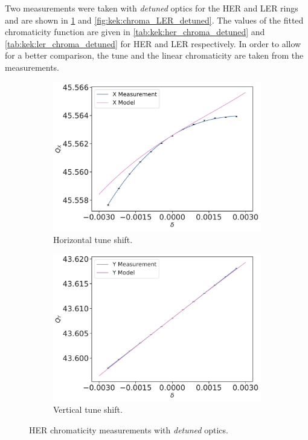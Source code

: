 Two measurements were taken with \textit{detuned} optics for the HER and LER rings and are shown in
\cref{fig:kek:chroma_HER_detuned} and \cref{fig:kek:chroma_LER_detuned}. The values of the fitted
chromaticity function are given in \cref{tab:kek:her_chroma_detuned} and
\cref{tab:kek:ler_chroma_detuned} for HER and LER respectively. In order to allow for a better
comparison, the tune and the linear chromaticity are taken from the measurements.

\begin{figure}[!htb]
    \centering
    \begin{subfigure}[b]{0.49\textwidth}
        \includegraphics[width=\linewidth]{images/kek/chromaticity/HER_09/qx_modelq0q1.pdf}
        \caption{Horizontal tune shift.}
    \end{subfigure}
    \begin{subfigure}[b]{0.49\textwidth}
        \includegraphics[width=\linewidth]{images/kek/chromaticity/HER_09/qy_modelq0q1.pdf}
        \caption{Vertical tune shift.}
    \end{subfigure}
    \caption{HER chromaticity measurements with \textit{detuned} optics.}
    \label{fig:kek:chroma_HER_detuned}
\end{figure}

